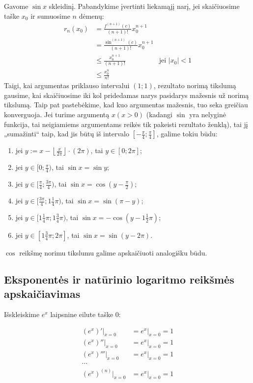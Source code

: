 Gavome $\sin x$ skleidinį. Pabandykime įvertinti liekamąjį narį, jei
skaičiuosime taške $x_{0}$ ir sumuosime $n$ dėmenų:
\begin{align}
  r_{n}(x_{0}) %
  &= \frac{f^{(n+1)}(c)}{(n+1)!} x_{0}^{n+1} \\
  &= \frac{\sin^{(n+1)}(c)}{(n+1)!} x_{0}^{n+1} \\
  &\leq \frac{x_{0}^{n+1}}{(n+1)!} & \text{jei } |x_{0}| < 1 \\
  &\leq \frac{x_{0}^{n}}{n!} 
\end{align}
Taigi, kai argumentas priklauso intervalui $(1; 1)$, rezultato norimą
tikslumą gausime, kai skaičiuosime iki kol pridedamas narys pasidarys
mažesnis už norimą tikslumą. Taip pat pastebėkime, kad kuo argumentas
mažesnis, tuo seka greičiau konverguoja. Jei turime argumentą 
$x (x > 0)$ (kadangi $\sin$ yra nelyginė funkcija, tai neigiamiems 
argumentams reikės tik pakeisti rezultato ženklą), tai jį „sumažinti“ 
taip, kad jis būtų iš intervalo $[-\frac{\pi}{4}; \frac{\pi}{4}]$, galime 
tokiu būdu:
\begin{enumerate}
  \item jei $y := x - \left\lfloor \frac{x}{2\pi} \right\rfloor \cdot (2\pi)$, 
    tai $y \in [0; 2\pi]$;
  \item jei $y \in [0; \frac{\pi}{4})$, tai $\sin x = \sin y$;
  \item jei $y \in [\frac{\pi}{4}; \frac{3\pi}{4})$, tai $\sin x = \cos (y - \frac{\pi}{2})$;
  \item jei $y \in [\frac{3\pi}{4}; 1\frac{1}{4}\pi)$, tai 
    $\sin x = \sin (\pi - y)$;
  \item jei $y \in [1\frac{1}{4}\pi; 1\frac{3}{4}\pi)$, tai
    $\sin x = -\cos (y - 1\frac{1}{2}\pi)$;
  \item jei $y \in [1\frac{3}{4}\pi; 2\pi]$, tai
    $\sin x = \sin (y - 2\pi)$.
\end{enumerate}

$\cos$ reikšmę norimu tikslumu galime apskaičiuoti analogišku būdu.

\subsection{Eksponentės ir natūrinio logaritmo reikšmės apskaičiavimas}

Išskleiskime $e^{x}$ laipsnine eilute taške $0$:

\begin{align*}
  (e^{x})'|_{x=0} &= e^{x}|_{x=0} = 1 \\
  (e^{x})''|_{x=0} &= e^{x}|_{x=0} = 1 \\
  (e^{x})'''|_{x=0} &= e^{x}|_{x=0} = 1 \\
  \cdots \\
  (e^{x})^{(n)}|_{x=0} &= e^{x}|_{x=0} = 1 \\
\end{align*}

